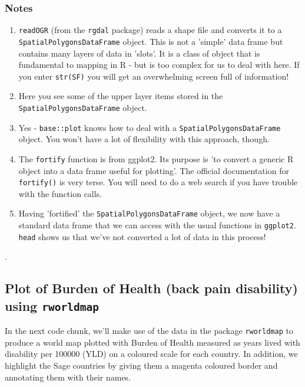 \documentclass[titlepage]{book}\usepackage{knitr}
\begin{document}
\subsubsection{Notes}
\begin{enumerate}



\item{ \texttt{readOGR} (from the \texttt{rgdal} package) reads a shape file and converts it to a \texttt{SpatialPolygonsDataFrame} object. This is not a 'simple' data frame but contains many layers of data in 'slots'. It is a class of object that is fundamental to mapping in R - but is too complex for us to deal with here. If you enter \texttt{str(SF)} you will get an overwhelming  screen full of information!}
\item {Here you see some of the upper layer items stored in the \texttt{SpatialPolygonsDataFrame} object.}



\item {Yes - \texttt{base::plot} knows how to deal with a \texttt{SpatialPolygonsDataFrame} object. You won't have a lot of flexibility with this approach, though.}
\item {The \texttt{fortify} function is from ggplot2. Its purpose is 'to convert a generic R object into  a data frame useful for plotting'. The official documentation for \texttt{fortify()} is very terse. You will need to do a web search if you have trouble with the function calls.}
\item {Having 'fortified' the \texttt{SpatialPolygonsDataFrame} object, we now have a standard data frame that we can access with the usual functions in \texttt{ggplot2}. \texttt{head} shows us that we've not converted a lot of data in this process!}
\end{enumerate}.



\subsection{Plot of Burden of Health (back pain disability) using \texttt {rworldmap}}

In the next code chunk, we'll make use of the data in the package \texttt {rworldmap} to produce a world map plotted with Burden of Health measured as years lived with disability per 100000 (YLD) on a coloured scale for each country. In addition, we highlight the Sage countries by giving them a magenta coloured border and annotating them with their names.
\end{document}
